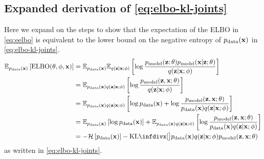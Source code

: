 \subsection{Expanded derivation of \cref{eq:elbo-kl-joints}}
Here we expand on the steps to show that the expectation of the ELBO in
\cref{eq:eelbo} is equivalent to the lower bound on the negative entropy of
$p_{\rm{data}}{}(\mathbf{x}{})$ in \cref{eq:elbo-kl-joints}.
\begin{align}
  \EX_{\pdata{}(\I{})} \left[ \text{ELBO}(\theta, \phi, \I{}) \right] &= \EX_{\pdata(\I{})} \EX_{q(\z{}|\I{}; \phi)} \left[ \log\frac{\pmodel{}(\z{}; \theta)\pmodel{}(\I{}|\z{}; \theta)}{q(\z{}|\I{}; \phi)} \right] \label{eq:eelbo-repeat}\\
                                                                      &= \EX_{\pdata(\I{})q(\z{}|\I{}; \phi)} \left[ \log\frac{\pmodel{}(\z{}, \I{}; \theta)}{q(\z{}|\I{}; \phi)} \right] \\
                                                                      &= \EX_{\pdata(\I{})q(\z{}|\I{}; \phi)} \left[ \log\pdata{}(\I{}) + \log\frac{\pmodel{}(\z{}, \I{}; \theta)}{\pdata{}(\I{})q(\z{}|\I{}; \phi)} \right] \\
                                                                      &= \EX_{\pdata(\I{})} \left[ \log\pdata(\I{}) \right] + \EX_{\pdata(\I{})q(\z{}|\I{}; \phi)} \left[ \log\frac{\pmodel{}(\z{}, \I{}; \theta)}{\pdata{}(\I{})q(\z{}|\I{}; \phi)} \right] \\
                                                                      &= -\mathcal{H}\left[ \pdata(\I) \right] - \kl[\big] { \pdata{}(\I{})q(\z{}|\I{}; \phi) }{ \pmodel{}(\z{}, \I; \theta) } \label{eq:elbo-kl-joints-repeat}
\end{align}
as written in \cref{eq:elbo-kl-joints}.

